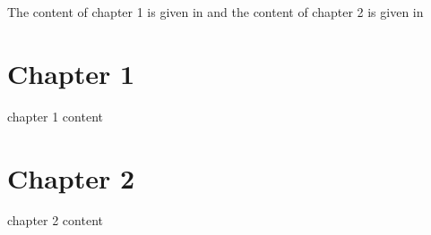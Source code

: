 

The content of chapter 1 is given in  and the content of chapter 2 is given in 
\chapter{Chapter 1}

\myminitoc
\label{0}





\label{1}
chapter 1 content
\chapter{Chapter 2}

\myminitoc
\label{2}





\label{3}
chapter 2 content



